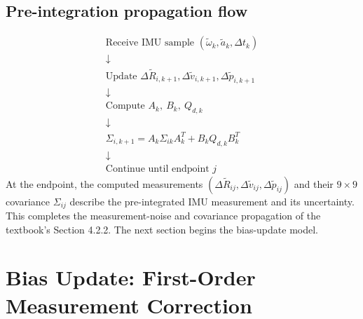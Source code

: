 \documentclass[11pt,a4paper]{article}
\begin{document}
\subsection{Pre-integration propagation flow}
\[
\boxed{\begin{array}{c}
\text{Receive IMU sample }(\tilde\omega_k,\tilde a_k,\Delta t_k)\\[2mm]
\downarrow\\[2mm]
\text{Update }\Delta\tilde R_{i,k+1},\Delta\tilde v_{i,k+1},\Delta\tilde p_{i,k+1}\\[2mm]
\downarrow\\[2mm]
\text{Compute }A_k,\ B_k,\ Q_{d,k}\\[2mm]
\downarrow\\[2mm]
\Sigma_{i,k+1}=A_k\Sigma_{ik}A_k^T+B_kQ_{d,k}B_k^T\\[2mm]
\downarrow\\[2mm]
\text{Continue until endpoint }j
\end{array}}
\]
At the endpoint, the computed measurements
$(\Delta\tilde R_{ij},\Delta\tilde v_{ij},\Delta\tilde p_{ij})$
and their $9\times9$ covariance $\Sigma_{ij}$ describe the
pre-integrated IMU measurement and its uncertainty. This completes the measurement-noise and covariance propagation of
the textbook's Section 4.2.2. The next section begins the bias-update model.


\section{Bias Update: First-Order Measurement Correction}
\end{document}
